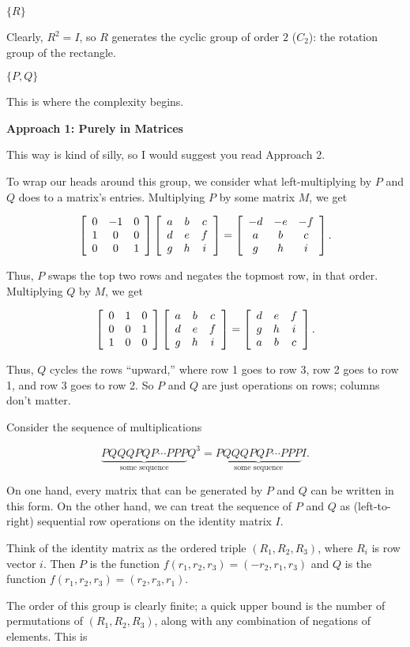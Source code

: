 \documentclass[../key.tex]{subfiles}
\begin{document}
\begin{inner_problem}
\item $\{R\}$
\end{inner_problem}

Clearly, $R^2 = I$, so $R$ generates the cyclic group of order $2$ ($C_2$): the rotation group of the rectangle.

\begin{inner_problem}
\item $\{P,Q\}$
\end{inner_problem}

This is where the complexity begins.

\textbf{Approach 1: Purely in Matrices}

This way is kind of silly, so I would suggest you read Approach 2.

To wrap our heads around this group, we consider what left-multiplying by $P$ and $Q$ does to a matrix's entries. Multiplying $P$ by some matrix $M$, we get

$$\left[\begin{array}{ccc} 0 & -1 & 0 \\ 1 & 0 & 0 \\ 0 & 0 & 1 \end{array}\right]\left[\begin{array}{ccc} a & b & c \\ d & e & f \\ g & h & i \end{array}\right] = \left[\begin{array}{ccc} -d & -e & -f \\ a & b & c \\ g & h & i \end{array}\right].$$

Thus, $P$ swaps the top two rows and negates the topmost row, in that order. Multiplying $Q$ by $M$, we get

$$\left[\begin{array}{ccc} 0 & 1 & 0 \\ 0 & 0 & 1 \\ 1 & 0 & 0 \end{array}\right]\left[\begin{array}{ccc} a & b & c \\ d & e & f \\ g & h & i \end{array}\right] = \left[\begin{array}{ccc} d & e & f \\ g & h & i \\ a & b & c \end{array}\right].$$

Thus, $Q$ cycles the rows ``upward,'' where row 1 goes to row 3, row 2 goes to row 1, and row 3 goes to row 2. So $P$ and $Q$ are just operations on rows; columns don't matter.

Consider the sequence of multiplications

$$\underbrace{PQQQPQP\cdots PPP}_{\text{some sequence}} Q^3 = \underbrace{PQQQPQP\cdots PPP}_{\text{some sequence}} I.$$

On one hand, every matrix that can be generated by $P$ and $Q$ can be written in this form. On the other hand, we can treat the sequence of $P$ and $Q$ as (left-to-right) sequential row operations on the identity matrix $I$.

Think of the identity matrix as the ordered triple $(R_1,R_2,R_3)$, where $R_i$ is row vector $i$. Then $P$ is the function $f(r_1,r_2,r_3) = (-r_2,r_1,r_3)$ and $Q$ is the function $f(r_1,r_2,r_3) = (r_2,r_3,r_1)$.

The order of this group is clearly finite; a quick upper bound is the number of permutations of $(R_1,R_2,R_3)$, along with any combination of negations of elements. This is
\end{document}
